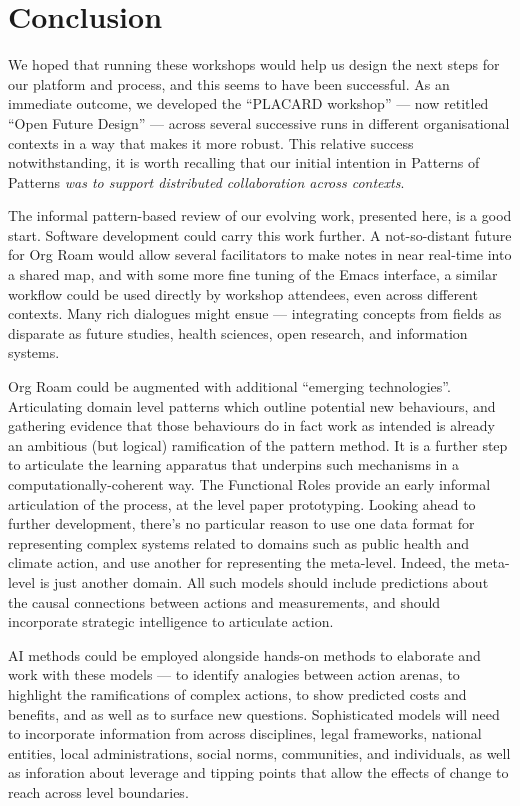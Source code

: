 \documentclass[acmlarge,timestamp]{acmart}
\begin{document}
\section{Conclusion}

We hoped that running these workshops would help us design the next
steps for our platform and process, and this seems to have been
successful.  As an immediate outcome, we developed the “PLACARD
workshop” — now retitled “Open Future Design” — across several
successive runs in different organisational contexts in a way that
makes it more robust.  This relative success notwithstanding, it is
worth recalling that our initial intention in Patterns of Patterns
\emph{was to support distributed collaboration across contexts}.

The informal pattern-based review of our evolving work, presented
here, is a good start.  Software development could carry this work
further.  A not-so-distant future for Org Roam would allow several
facilitators to make notes in near real-time into a shared map, and
with some more fine tuning of the Emacs interface, a similar workflow
could be used directly by workshop attendees, even across different
contexts.  Many rich dialogues might ensue — integrating concepts from
fields as disparate as future studies, health sciences, open research,
and information systems.

Org Roam could be augmented with additional “emerging technologies”.
Articulating domain level patterns which outline potential new
behaviours, and gathering evidence that those behaviours do in fact
work as intended is already an ambitious (but logical) ramification of
the pattern method.  It is a further step to articulate the learning
apparatus that underpins such mechanisms in a computationally-coherent
way.  The {\sc Functional Roles} provide an early informal
articulation of the process, at the level paper prototyping.  Looking
ahead to further development, there’s no particular reason to use one
data format for representing complex systems related to domains such
as public health and climate action, and use another for representing
the meta-level.  Indeed, the meta-level is just another domain.  All
such models should include predictions about the causal connections
between actions and measurements, and should incorporate strategic
intelligence to articulate action.

AI methods could be employed alongside hands-on methods to elaborate
and work with these models — to identify analogies between action
arenas, to highlight the ramifications of complex actions, to show
predicted costs and benefits, and as well as to surface new questions.
Sophisticated models will need to incorporate information from across
disciplines, legal frameworks, national entities, local
administrations, social norms, communities, and individuals, as well
as inforation about leverage and tipping points that allow the effects
of change to reach across level boundaries.
\end{document}
